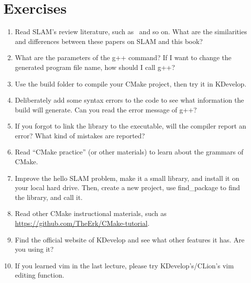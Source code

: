 \section*{Exercises}
\begin{enumerate}
    \item[\optional] Read SLAM's review literature, such as~\cite{Cadena2016, Fuentes-Pacheco2015, Boal2014, Chen2012, Chen2007} and so on. What are the similarities and differences between these papers on SLAM and this book?
    \item What are the parameters of the g++ command? If I want to change the generated program file name, how should I call g++?
    \item Use the build folder to compile your CMake project, then try it in KDevelop.
    \item Deliberately add some syntax errors to the code to see what information the build will generate. Can you read the error message of g++?
    \item If you forgot to link the library to the executable, will the compiler report an error? What kind of mistakes are reported?
    \item[\optional] Read ``CMake practice'' (or other materials) to learn about the grammars of CMake.
    \item[\optional] Improve the hello SLAM problem, make it a small library, and install it on your local hard drive. Then, create a new project, use find\_package to find the library, and call it.
    \item[\optional] Read other CMake instructional materials, such as \url{https://github.com/TheErk/CMake-tutorial}.
    \item Find the official website of KDevelop and see what other features it has. Are you using it?
    \item If you learned vim in the last lecture, please try KDevelop's/CLion's vim editing function.
\end{enumerate}
